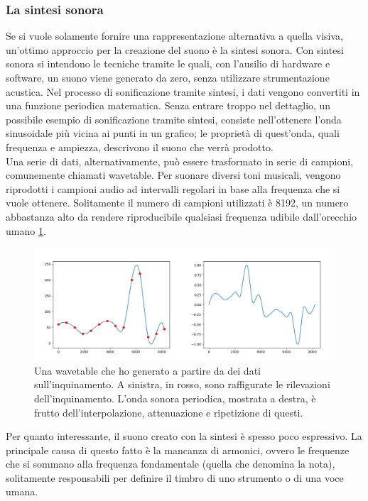 \subsubsection{La sintesi sonora}
Se si vuole solamente fornire una rappresentazione alternativa a quella visiva, un'ottimo approccio per la creazione del suono è la sintesi sonora.
Con sintesi sonora si intendono le tecniche tramite le quali, con l'ausilio di hardware e software, un suono viene generato da zero, senza utilizzare strumentazione acustica.
Nel processo di sonificazione tramite sintesi, i dati vengono convertiti in una funzione periodica matematica.
Senza entrare troppo nel dettaglio, un possibile esempio di sonificazione tramite sintesi, consiste nell'ottenere l'onda sinusoidale più vicina ai punti in un grafico; le proprietà di quest'onda, quali frequenza e ampiezza, descrivono il suono che verrà prodotto.
\\
Una serie di dati, alternativamente, può essere trasformato in serie di campioni, comunemente chiamati wavetable.
Per suonare diversi toni musicali, vengono riprodotti i campioni audio ad intervalli regolari in base alla frequenza che si vuole ottenere.
Solitamente il numero di campioni utilizzati è 8192, un numero abbastanza alto da rendere riproducibile qualsiasi frequenza udibile dall'orecchio umano \ref{fig:wavetable}.
\begin{figure}[H]
  \includegraphics[width=\linewidth]{img/image.png}
  \caption{Una wavetable che ho generato a partire da dei dati sull'inquinamento.
  A sinistra, in rosso, sono raffigurate le rilevazioni dell'inquinamento. L'onda sonora periodica, mostrata a destra, è frutto dell'interpolazione, attenuazione e ripetizione di questi.}
  \label{fig:wavetable}
\end{figure}

 
Per quanto interessante, il suono creato con la sintesi è spesso poco espressivo.
La principale causa di questo fatto è la mancanza di armonici, ovvero le frequenze che si sommano alla frequenza fondamentale (quella che denomina la nota), solitamente responsabili per definire il timbro di uno strumento o di una voce umana.
